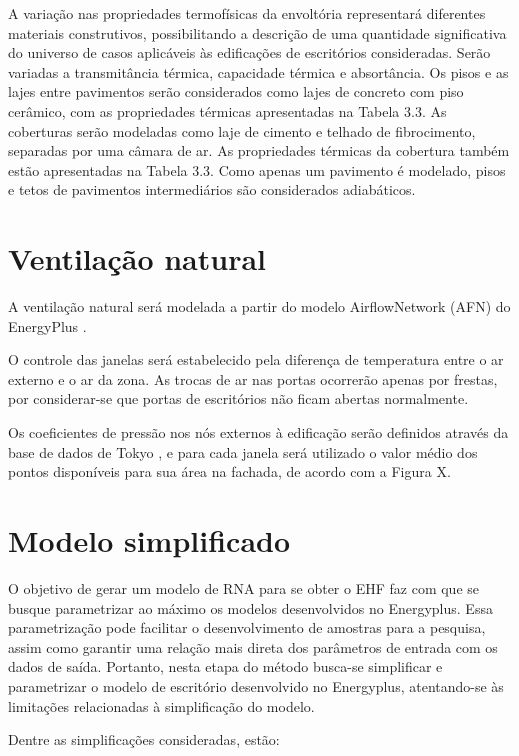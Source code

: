 \documentclass[brazil,hardcopy,openany,a5paper]{ufscthesis}
\begin{document}
		A variação nas propriedades termofísicas da envoltória representará diferentes materiais construtivos, possibilitando a descrição de uma quantidade significativa do universo de casos aplicáveis às edificações de escritórios consideradas. Serão variadas a transmitância térmica, capacidade térmica e absortância. Os pisos e as lajes entre pavimentos serão considerados como lajes de concreto com piso cerâmico, com as propriedades térmicas apresentadas na Tabela 3.3. As coberturas serão modeladas como laje de cimento e telhado de fibrocimento, separadas por uma câmara de ar. As propriedades térmicas da cobertura também estão apresentadas na Tabela 3.3. Como apenas um pavimento é modelado, pisos e tetos de pavimentos intermediários são considerados adiabáticos.
		
		\section{Ventilação natural}
		
		A ventilação natural será modelada a partir do modelo AirflowNetwork (AFN) do EnergyPlus \cite{EnergyPlus2018}.
		
		O controle das janelas será estabelecido pela diferença de temperatura entre o ar externo e o ar da zona. As trocas de ar nas portas ocorrerão apenas por frestas, por considerar-se que portas de escritórios não ficam abertas normalmente.
		
		Os coeficientes de pressão nos nós externos à edificação serão definidos através da base de dados de Tokyo \cite{TPU2018}, e para cada janela será utilizado o valor médio dos pontos disponíveis para sua área na fachada, de acordo com a Figura X.
		
		\section{Modelo simplificado}
		
		O objetivo de gerar um modelo de RNA para se obter o EHF faz com que se busque parametrizar ao máximo os modelos desenvolvidos no Energyplus. Essa parametrização pode facilitar o desenvolvimento de amostras para a pesquisa, assim como garantir uma relação mais direta dos parâmetros de entrada com os dados de saída. Portanto, nesta etapa do método busca-se simplificar e parametrizar o modelo de escritório desenvolvido no Energyplus, atentando-se às limitações relacionadas à simplificação do modelo.
		
		Dentre as simplificações consideradas, estão:
		
\end{document}
